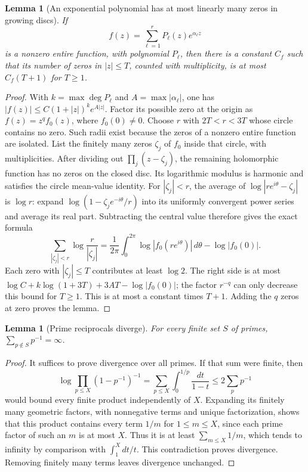 \documentclass[11pt]{article}
\newtheorem{lemma}[theorem]{Lemma}
\begin{document}
\begin{lemma}[An exponential polynomial has at most linearly many
zeros in growing discs]\label{lem:zero-count}
If
\[
 f(z)=\sum_{\ell=1}^r P_\ell(z)e^{\alpha_\ell z}
 \tag{PO23}\label{po:exp-polynomial}
\]
is a nonzero entire function, with polynomial \(P_\ell\), then
there is a constant \(C_f\) such that its number of zeros in
\(|z|\le T\), counted with multiplicity, is at most
\(C_f(T+1)\) for \(T\ge1\).
\end{lemma}
\begin{proof}
With \(k=\max\deg P_\ell\) and \(A=\max|\alpha_\ell|\), one has
\(|f(z)|\le C(1+|z|)^k e^{A|z|}\).
Factor its possible zero at the origin as \(f(z)=z^q f_0(z)\),
where \(f_0(0)\ne0\).
Choose \(r\) with \(2T<r<3T\) whose circle contains no zero.
Such radii exist because the zeros of a nonzero entire function
are isolated. List the finitely many zeros \(\zeta_j\) of \(f_0\)
inside that circle, with multiplicities. After dividing out
\(\prod_j(z-\zeta_j)\), the remaining holomorphic function has
no zeros on the closed disc. Its logarithmic modulus is harmonic
and satisfies the circle mean-value identity. For \(|\zeta_j|<r\),
the average of \(\log|re^{i\theta}-\zeta_j|\) is \(\log r\):
expand \(\log(1-\zeta_je^{-i\theta}/r)\) into its uniformly
convergent power series and average its real part.
Subtracting the central value therefore gives the exact formula
\[
 \sum_{|\zeta_j|<r}\log\frac r{|\zeta_j|}
  =\frac1{2\pi}\int_0^{2\pi}
       \log|f_0(re^{i\theta})|\,d\theta-\log|f_0(0)|.
 \tag{PO24}\label{po:circle-count}
\]
Each zero with \(|\zeta_j|\le T\) contributes at least \(\log2\).
The right side is at most
\(\log C+k\log(1+3T)+3AT-\log|f_0(0)|\);
the factor \(r^{-q}\) can only decrease this bound for \(T\ge1\).
This is at most a constant times \(T+1\).
Adding the \(q\) zeros at zero proves the lemma.
\end{proof}

\begin{lemma}[Prime reciprocals diverge]\label{lem:Euler}
For every finite set \(S\) of primes,
\(\sum_{p\notin S}p^{-1}=\infty\).
\end{lemma}
\begin{proof}
It suffices to prove divergence over all primes.
If that sum were finite, then
\[
 \log\prod_{p\le X}(1-p^{-1})^{-1}
  =\sum_{p\le X}\int_0^{1/p}\frac{dt}{1-t}
  \le2\sum_p p^{-1}
 \tag{PO25}
\]
would bound every finite product independently of \(X\).
Expanding its finitely many geometric factors, with nonnegative
terms and unique factorization, shows that this product contains
every term \(1/m\) for \(1\le m\le X\), since each prime factor
of such an \(m\) is at most \(X\).
Thus it is at least \(\sum_{m\le X}1/m\), which tends to
infinity by comparison with \(\int_1^X dt/t\).
This contradiction proves divergence. Removing finitely many
terms leaves divergence unchanged.
\end{proof}
\end{document}
